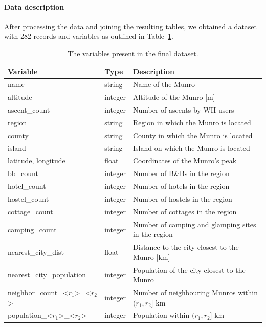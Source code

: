 \documentclass[11pt,a4paper]{article}
\begin{document}
\paragraph{Data description} 

After processing the data and joining the resulting tables, we obtained a dataset with 282 records and variables as outlined in Table~\ref{table:1}.

\begin{table}[h!]
    \caption{The variables present in the final dataset.}
    \label{table:1}
    \centering
    \begin{tabular}{l  l  l} 
        \toprule
        Variable & Type & Description  \\ 
        \midrule
        name & string & Name of the Munro \\ 
        altitude & integer & Altitude of the Munro [m] \\
        ascent\_count & integer & Number of ascents by WH users\\
        \hline
        region & string & Region in which the Munro is located \\
        county & string & County in which the Munro is located\\
        island & string & Island on which the Munro is located\\
        latitude, longitude & float & Coordinates of the Munro's peak\\
        \hline
        bb\_count & integer & Number of B\&Bs in the region\\
        hotel\_count & integer & Number of hotels in the region\\
        hostel\_count & integer & Number of hostels in the region\\
        cottage\_count & integer & Number of cottages in the region\\
        camping\_count & integer & Number of camping and glamping sites in the region\\
        \hline
        nearest\_city\_dist & float & Distance to the city closest to the Munro [km]\\
        nearest\_city\_population & integer & Population of the city closest to the Munro\\
        neighbor\_count\_<$r_1$>\_<$r_2$> & integer & Number of neighbouring Munros within $(r_1,r_2]$ km\\
        population\_<$r_1$>\_<$r_2$> & integer & Population within $(r_1,r_2]$ km\\
        \bottomrule
    \end{tabular}
\end{table}
\end{document}
